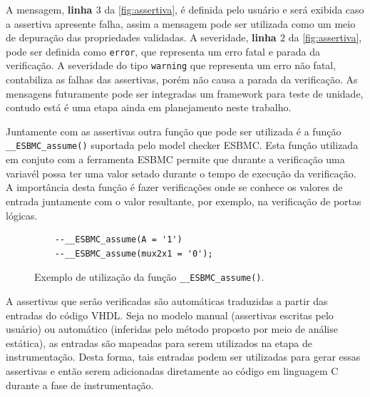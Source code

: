 \par
A mensagem, \textbf{linha $3$} da \autoref{fig:assertiva}, é definida pelo usuário e será exibida caso a assertiva apresente falha, assim a mensagem pode ser utilizada como um meio de depuração das propriedades validadas. A severidade, \textbf{linha $2$} da \autoref{fig:assertiva}, pode ser definida como \texttt{error}, que representa um erro fatal e parada da verificação. A severidade do tipo \texttt{warning} que representa um erro não fatal, contabiliza as falhas das assertivas, porém não causa a parada da verificação. As mensagens futuramente pode ser integradas um framework para teste de unidade, contudo está é uma etapa ainda em planejamento neste trabalho.

\par
Juntamente com as assertivas outra função que pode ser utilizada é a função \texttt{\_\_ESBMC\allowbreak{}\_assume()} suportada pelo model checker ESBMC. Esta função utilizada em conjuto com a ferramenta ESBMC permite que durante a verificação uma variavél possa ter uma valor setado durante o tempo de execução da verificação. A importância desta função é fazer verificações onde se conhece os valores de entrada juntamente com o valor resultante, por exemplo, na verificação de portas lógicas.

\begin{figure}[H]
\caption{\label{fig:assertiva_assume} Exemplo de utilização da função \texttt{\_\_ESBMC\_assume()}.}
	\begin{center}
    \begin{minipage}{0.99\textwidth}
    \begin{lstlisting}       
    --__ESBMC_assume(A = '1')
    --__ESBMC_assume(mux2x1 = '0');
    \end{lstlisting}
    \end{minipage}
	\end{center}
\end{figure}

\par
A assertivas que serão verificadas são automáticas traduzidas a partir das entradas do código VHDL. Seja no modelo manual (assertivas escritas pelo usuário) ou automático (inferidas pelo método proposto por meio de análise estática), as entradas são mapeadas para serem utilizados na etapa de instrumentação. Desta forma, tais entradas podem ser utilizadas para gerar essas assertivas e então serem adicionadas diretamente ao código em linguagem C durante a fase de instrumentação.

